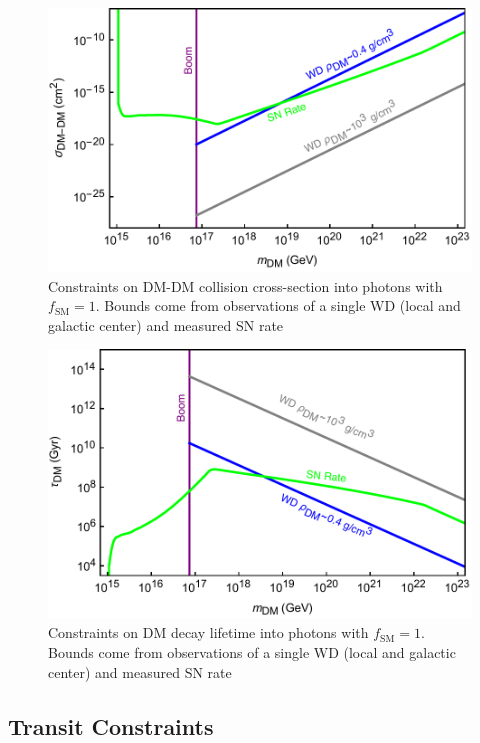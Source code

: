 \documentclass[twocolumn,preprintnumbers,amsmath,amssymb,prd, superscriptaddress]{revtex4} %
\begin{document}
\begin{figure}
\includegraphics[scale=.45]{collisionobservation.pdf}
\caption{Constraints on DM-DM collision cross-section into photons with $f_\text{SM} =1$. Bounds come from observations of a single WD (local and galactic center) and measured SN rate}
\label{fig:collisionclasses}
\end{figure}

\begin{figure}
\includegraphics[scale=.45]{decayobservation.pdf}
\caption{Constraints on DM decay lifetime into photons with $f_\text{SM} =1$. Bounds come from observations of a single WD (local and galactic center) and measured SN rate}
\label{fig:decayclasses}
\end{figure}

\subsection{Transit Constraints}
\label{sec:TransitConstraints}
\end{document}
